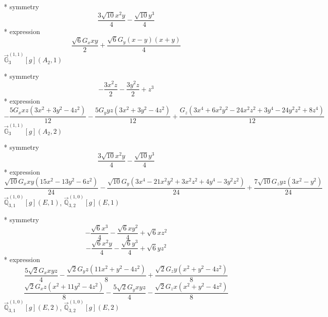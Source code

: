 \documentclass[fleqn,8pt]{jsarticle}
\begin{document}
\noindent\quad ** symmetry
\begin{dmath*}
\frac{3 \sqrt{10} x^{2} y}{4} - \frac{\sqrt{10} y^{3}}{4}
\end{dmath*}
\noindent\quad ** expression
\begin{dmath*}
\frac{\sqrt{6} G_{x} x y}{2} + \frac{\sqrt{6} G_{y} \left(x - y\right) \left(x + y\right)}{4}
\end{dmath*}
\noindent\quad $\vec{\mathbb{G}}_{3}^{(1,1)}[g](A_{2},1)$

\noindent\quad ** symmetry
\begin{dmath*}
- \frac{3 x^{2} z}{2} - \frac{3 y^{2} z}{2} + z^{3}
\end{dmath*}
\noindent\quad ** expression
\begin{dmath*}
- \frac{5 G_{x} x z \left(3 x^{2} + 3 y^{2} - 4 z^{2}\right)}{12} - \frac{5 G_{y} y z \left(3 x^{2} + 3 y^{2} - 4 z^{2}\right)}{12} + \frac{G_{z} \left(3 x^{4} + 6 x^{2} y^{2} - 24 x^{2} z^{2} + 3 y^{4} - 24 y^{2} z^{2} + 8 z^{4}\right)}{12}
\end{dmath*}
\noindent\quad $\vec{\mathbb{G}}_{3}^{(1,1)}[g](A_{2},2)$

\noindent\quad ** symmetry
\begin{dmath*}
\frac{3 \sqrt{10} x^{2} y}{4} - \frac{\sqrt{10} y^{3}}{4}
\end{dmath*}
\noindent\quad ** expression
\begin{dmath*}
\frac{\sqrt{10} G_{x} x y \left(15 x^{2} - 13 y^{2} - 6 z^{2}\right)}{24} - \frac{\sqrt{10} G_{y} \left(3 x^{4} - 21 x^{2} y^{2} + 3 x^{2} z^{2} + 4 y^{4} - 3 y^{2} z^{2}\right)}{24} + \frac{7 \sqrt{10} G_{z} y z \left(3 x^{2} - y^{2}\right)}{24}
\end{dmath*}
\noindent\quad $\vec{\mathbb{Q}}_{3,1}^{(1,0)}[g](E,1)$, $\vec{\mathbb{Q}}_{3,2}^{(1,0)}[g](E,1)$

\noindent\quad ** symmetry
\begin{dmath*}
- \frac{\sqrt{6} x^{3}}{4} - \frac{\sqrt{6} x y^{2}}{4} + \sqrt{6} x z^{2}
\end{dmath*}
\begin{dmath*}
- \frac{\sqrt{6} x^{2} y}{4} - \frac{\sqrt{6} y^{3}}{4} + \sqrt{6} y z^{2}
\end{dmath*}
\noindent\quad ** expression
\begin{dmath*}
\frac{5 \sqrt{2} G_{x} x y z}{4} - \frac{\sqrt{2} G_{y} z \left(11 x^{2} + y^{2} - 4 z^{2}\right)}{8} + \frac{\sqrt{2} G_{z} y \left(x^{2} + y^{2} - 4 z^{2}\right)}{8}
\end{dmath*}
\begin{dmath*}
\frac{\sqrt{2} G_{x} z \left(x^{2} + 11 y^{2} - 4 z^{2}\right)}{8} - \frac{5 \sqrt{2} G_{y} x y z}{4} - \frac{\sqrt{2} G_{z} x \left(x^{2} + y^{2} - 4 z^{2}\right)}{8}
\end{dmath*}
\noindent\quad $\vec{\mathbb{Q}}_{3,1}^{(1,0)}[g](E,2)$, $\vec{\mathbb{Q}}_{3,2}^{(1,0)}[g](E,2)$
\end{document}
